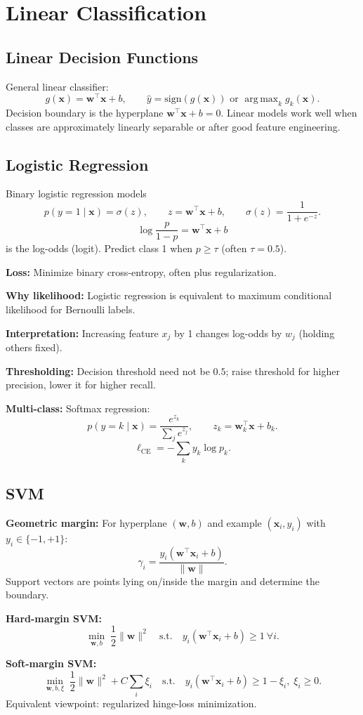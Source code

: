 \documentclass[10pt,twocolumn]{article}
\newcommand{\x}{\mathbf{x}}
\newcommand{\w}{\mathbf{w}}
\newcommand{\argmax}{\mathop{\mathrm{arg\,max}}}
\newcommand{\chead}[1]{\vspace{0.15em}\textbf{#1:} }
\begin{document}
\section{Linear Classification}
\subsection{Linear Decision Functions}
General linear classifier:
\[
g(\x)=\w^\top\x+b,
\qquad
\hat y = \mathrm{sign}(g(\x)) \text{ or } \argmax_k g_k(\x).
\]
Decision boundary is the hyperplane $\w^\top\x+b=0$. Linear models work well when classes are approximately linearly separable or after good feature engineering.

\subsection{Logistic Regression}
Binary logistic regression models
\[
p(y=1\mid\x)=\sigma(z),\qquad z=\w^\top\x+b,\qquad \sigma(z)=\frac{1}{1+e^{-z}}.
\]
\[
\log\frac{p}{1-p}=\w^\top\x+b
\]
is the log-odds (logit). Predict class 1 when $p\ge \tau$ (often $\tau=0.5$).

\chead{Loss} Minimize binary cross-entropy, often plus regularization.\

\chead{Why likelihood} Logistic regression is equivalent to maximum conditional likelihood for Bernoulli labels.

\chead{Interpretation} Increasing feature $x_j$ by 1 changes log-odds by $w_j$ (holding others fixed).\

\chead{Thresholding} Decision threshold need not be $0.5$; raise threshold for higher precision, lower it for higher recall.

\chead{Multi-class} Softmax regression:
\[
p(y=k\mid\x)=\frac{e^{z_k}}{\sum_j e^{z_j}}, \qquad z_k=\w_k^\top \x+b_k.
\]
\[
\ell_{\mathrm{CE}}=-\sum_k y_k\log p_k.
\]

\subsection{SVM}
\chead{Geometric margin} For hyperplane $(\w,b)$ and example $(\x_i,y_i)$ with $y_i\in\{-1,+1\}$:
\[
\gamma_i = \frac{y_i(\w^\top\x_i+b)}{\|\w\|}.
\]
Support vectors are points lying on/inside the margin and determine the boundary.

\chead{Hard-margin SVM}
\[
\min_{\w,b}\;\frac12\|\w\|^2 \quad \text{s.t.}\quad y_i(\w^\top\x_i+b)\ge 1\ \forall i.
\]

\chead{Soft-margin SVM}
\[
\min_{\w,b,\xi}\;\frac12\|\w\|^2 + C\sum_i \xi_i
\quad \text{s.t.}\quad
y_i(\w^\top\x_i+b)\ge 1-\xi_i,\; \xi_i\ge 0.
\]
Equivalent viewpoint: regularized hinge-loss minimization.
\end{document}
